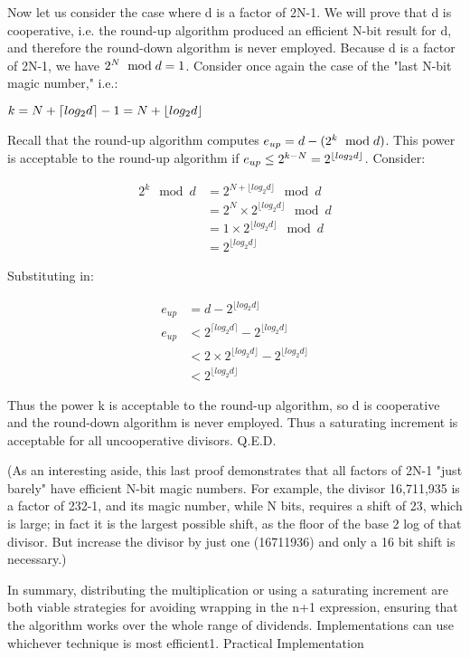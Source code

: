 Now let us consider the case where d is a factor of 2N-1. We will prove that d is cooperative, i.e. the round-up algorithm produced an efficient N-bit result for d, and therefore the round-down algorithm is never employed. Because d is a factor of 2N-1, we have $ \small 2^N\ \bmod{d} = 1 $. Consider once again the case of the "last N-bit magic number," i.e.:

$ \small k = N + \lceil log_2 d \rceil - 1 = N + \lfloor log_2 d \rfloor $

Recall that the round-up algorithm computes $ \small e_{up} = d - (2^k\ \bmod{d}) $. This power is acceptable to the round-up algorithm if $ \small e_{up} \leq 2^{k - N} = 2^{\lfloor log_2 d \rfloor} $. Consider:

$$ \begin{align} 2^k\ \bmod{d} & = 2^{N + \lfloor log_2 d \rfloor}\ \bmod{d} \\ & = 2^N \times 2^{\lfloor log_2 d \rfloor}\ \bmod{d} \\ & = 1 \times 2^{\lfloor log_2 d \rfloor}\ \bmod{d} \\ & = 2^{\lfloor log_2 d \rfloor} \end{align} $$

Substituting in:

$$ \begin{align} e_{up} & = d - 2^{\lfloor log_2 d \rfloor} \\ e_{up} & < 2^{\lceil log_2 d \rceil} - 2^{\lfloor log_2 d \rfloor} \\ & < 2 \times 2^{\lfloor log_2 d \rfloor} - 2^{\lfloor log_2 d \rfloor} \\ & < 2^{\lfloor log_2 d \rfloor} \end{align} $$

Thus the power k is acceptable to the round-up algorithm, so d is cooperative and the round-down algorithm is never employed. Thus a saturating increment is acceptable for all uncooperative divisors. Q.E.D.

(As an interesting aside, this last proof demonstrates that all factors of 2N-1 "just barely" have efficient N-bit magic numbers. For example, the divisor 16,711,935 is a factor of 232-1, and its magic number, while N bits, requires a shift of 23, which is large; in fact it is the largest possible shift, as the floor of the base 2 log of that divisor. But increase the divisor by just one (16711936) and only a 16 bit shift is necessary.)

In summary, distributing the multiplication or using a saturating increment are both viable strategies for avoiding wrapping in the n+1 expression, ensuring that the algorithm works over the whole range of dividends. Implementations can use whichever technique is most efficient1.
Practical Implementation

